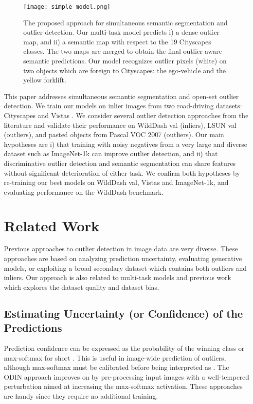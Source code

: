 \documentclass[runningheads]{llncs}
\begin{document}
\begin{figure}[htb]
\texttt{[image: simple\_model.png]}
  \caption{
    The proposed approach for simultaneous
    semantic segmentation and outlier detection.
    Our multi-task model predicts 
    i) a dense outlier map, and 
    ii) a semantic map with respect 
      to the 19 Cityscapes classes. 
    The two maps are merged to obtain
    the final outlier-aware 
    semantic predictions.
    Our model recognizes 
    outlier pixels (white) 
    on two objects
    which are foreign to Cityscapes:
    the ego-vehicle and the yellow forklift.
  }
  \label{fig:approach}
\end{figure}

This paper addresses simultaneous 
semantic segmentation and 
open-set outlier detection.
We train our models on inlier images
from two road-driving datasets: 
Cityscapes \cite{cordts15cvpr} 
and Vistas \cite{neuhold17iccv}.
We consider several 
outlier detection approaches 
from the literature
\cite{hendrycks17iclr,bevandic2018,hendrycks19iclr}
and validate their performance
on WildDash val (inliers),
LSUN val \cite{yu2015} (outliers),
and pasted objects from
Pascal VOC 2007 (outliers).
Our main hypotheses are
i) that training with noisy negatives 
  from a very large and diverse dataset
  such as ImageNet-1k \cite{deng09cvpr}
  can improve outlier detection,
and ii) that discriminative outlier detection and semantic
segmentation can share features
without significant deterioration of either task.
We confirm both hypotheses
by re-training our best models 
on WildDash val, Vistas and ImageNet-1k,
and evaluating performance
on the WildDash benchmark.





\section{Related Work}

Previous approaches to 
outlier detection in image data
are very diverse.
These approaches are based on
analyzing prediction uncertainty,
evaluating generative models,
or exploiting a broad secondary dataset 
which contains both outliers and inliers.
Our approach is also related
to multi-task models 
and previous work which explores
the dataset quality and dataset bias.

\subsection{Estimating Uncertainty 
  (or Confidence) of the Predictions}
Prediction confidence can be expressed 
as the probability of the winning class 
or max-softmax for short \cite{hendrycks17iclr}.
This is useful in image-wide
prediction of outliers,
although max-softmax 
must be calibrated \cite{guo17icml}
before being interpreted as .
The ODIN approach \cite{liang18iclr}
improves on \cite{hendrycks17iclr} 
by pre-processing input images 
with a well-tempered perturbation 
aimed at increasing 
the max-softmax activation.
These approaches are handy since they 
require no additional training.
\end{document}
